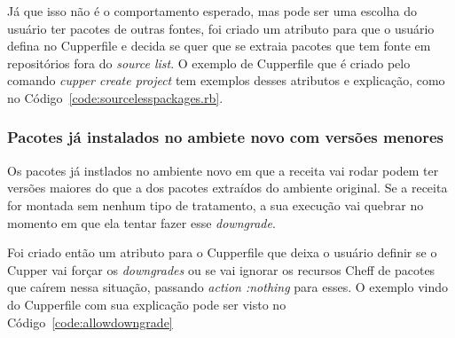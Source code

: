 Já que isso não é o comportamento esperado, mas pode ser uma escolha do usuário
ter pacotes de outras fontes, foi criado um atributo para que o usuário defina no
Cupperfile e decida se quer que se extraia pacotes que tem fonte em repositórios
fora do \textit{source list}. O exemplo de Cupperfile que é criado pelo comando
\textit{cupper create project} tem exemplos desses atributos e explicação, como
no Código~\ref{code:sourcelesspackages.rb}.

\noindent\begin{minipage}{0.7\textwidth}
  \lstset{style=shell}
  
\end{minipage}\hfill

\subsubsection{Pacotes já instalados no ambiete novo com versões menores}
Os pacotes já instlados no ambiente novo em que a receita vai rodar podem ter versões
maiores do que a dos pacotes extraídos do ambiente original. Se a receita for
montada sem nenhum tipo de tratamento, a sua execução vai quebrar no momento
em que ela tentar fazer esse \textit{downgrade}.

Foi criado então um atributo para o Cupperfile que deixa o usuário definir
se o Cupper vai forçar os \textit{downgrades} ou se vai ignorar os recursos
Cheff de pacotes que caírem nessa situação, passando \textit{action :nothing}
para esses. O exemplo vindo do Cupperfile com sua explicação pode ser visto no
Código~\ref{code:allowdowngrade}

\noindent\begin{minipage}{0.7\textwidth}
  \lstset{style=shell}
  
\end{minipage}\hfill
